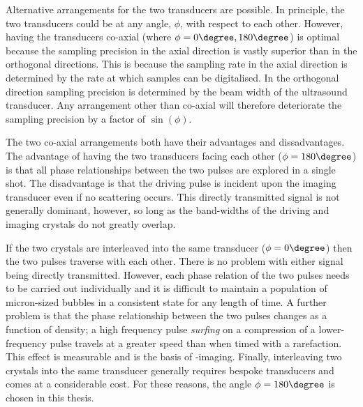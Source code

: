 
Alternative arrangements for the two transducers are possible.
In principle, the two transducers could be at any angle, $\phi$, with respect to each other.
However, having the transducers co-axial (where $\phi = 0\degree,180\degree$) is optimal because
the sampling precision in the axial direction is vastly superior than in the orthogonal directions.
This is because the sampling rate in the axial direction is determined by the rate at which samples can be digitalised.
In the orthogonal direction sampling precision  is determined by the beam width of the ultrasound transducer.
Any arrangement other than co-axial will therefore deteriorate the sampling precision by a factor of $\sin(\phi)$.

The two co-axial arrangements both have their advantages and dissadvantages.
The advantage of having the two transducers facing each other ($\phi = 180\degree$) 
is that all phase relationships between the two pulses are explored in a single shot.
The disadvantage is that the driving pulse is incident upon the imaging transducer even if no scattering occurs.
This directly transmitted signal is not generally dominant, however, so long as the  band-widths of the driving and imaging crystals do not greatly overlap.

If the two crystals are interleaved into the same transducer ($\phi = 0\degree$) then the two pulses traverse with each other.  
There is no problem with either signal being directly transmitted.
However, each phase relation of the two pulses needs to be carried out individually
and it is difficult to maintain a population of micron-sized bubbles in a consistent state for any length of time.
A further problem is that the phase relationship between the two pulses changes as a function of density;
a high frequency pulse {\em surfing} on a compression of a lower-frequency pulse travels at a greater speed than when timed with a rarefaction.
This effect is measurable and is the basis of {\surf}-imaging\cite{Anderson}.
Finally, interleaving two crystals into the same transducer generally requires bespoke transducers
and comes at a considerable cost.
For these reasons, the angle $\phi = 180\degree$ is chosen in this thesis.


